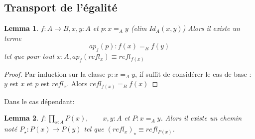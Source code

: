 \documentclass{article}
\newtheorem{lemma}{Lemma}
\begin{document}
\subsection{Transport de l'égalité}
\begin{lemma}
$f : A \to B, x,y :A$ et $p:x=_A y$ (elim $Id_A(x,y)$)
Alors il existe un terme
\[ap_f(p) : f(x) =_B f(y)\]
tel que pour tout $x:A, ap_f (refl_x) \equiv refl_{f(x)}$
\end{lemma}

\begin{proof}
Par induction sur la classe $p: x=_A y$, if suffit de considérer le cas de base : $y$ est $x$ et $p$ est $refl_x$. Alors $refl_{f(x)} =_B f(x)$


\end{proof}


Dans le cas dépendant:
\begin{lemma}

$f : \prod_{x:A} P(x), \qquad x,y :A$ et $P:x=_A y$. Alors il existe un chemin noté $P_\star : P(x) \to P(y)$ tel que $(refl_x)_\star \equiv refl_{P(x)}$.
\end{lemma}
\end{document}
